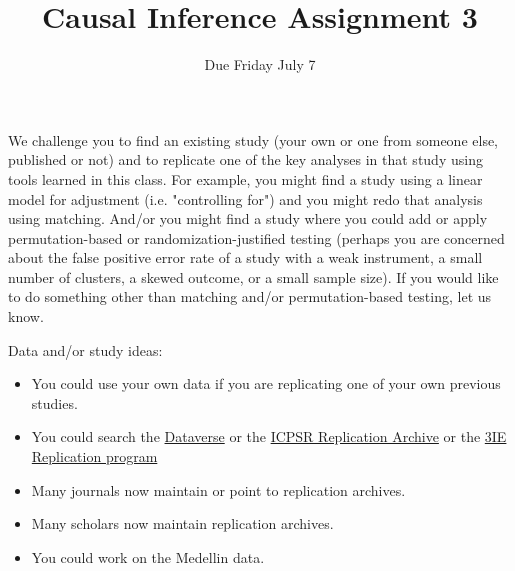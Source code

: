 \documentclass{article}
\title{Causal Inference Assignment 3}
\author{Due Friday July 7}
\begin{document}
\maketitle

We challenge you to find an existing study (your own or one from someone else,
published or not) and to replicate one of the key analyses in that study using
tools learned in this class. For example, you might find a study using a linear
model for adjustment (i.e. "controlling for") and you might redo that analysis
using matching. And/or you might find a study where you could add or apply
permutation-based or randomization-justified testing (perhaps you are concerned
about the false positive error rate of a study with a weak instrument, a small
number of clusters, a skewed outcome, or a small sample size). If you would like
to do something other than matching and/or permutation-based testing, let us
know.

Data and/or study ideas: \begin{itemize}
 \item You could use your own data if you are replicating one of your own
      previous studies.
 \item You could search the \href{http://dataverse.org/}{Dataverse} or the
      \href{http://www.icpsr.umich.edu/icpsrweb/deposit/pra/index.jsp}{ICPSR
      Replication Archive} or the
      \href{http://www.3ieimpact.org/evaluation/impact-evaluation-replication-programme/}{3IE
      Replication program}
 \item Many journals now maintain or point to replication archives.
 \item Many scholars now maintain replication archives.
 \item You could work on the Medellin data.
\end{itemize}
\end{document}

